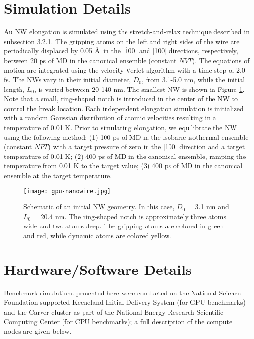 \documentclass[10pt]{report}  %
\newcommand\findent{\hspace*{\parindent}}
\begin{document}
\section{Simulation Details}

\findent Au NW elongation is simulated using the stretch-and-relax technique described in subsection 3.2.1. The gripping atoms on the left and right sides of the wire are periodically displaced by 0.05 \AA\ in the [$\bar{1}$00] and [100] directions, respectively, between 20 ps of MD in the canonical ensemble (constant $NVT$). The equations of motion are integrated using the velocity Verlet algorithm with a time step of 2.0 fs. The NWs vary in their initial diameter, $D_{0}$, from 3.1-5.0 nm, while the initial length, $L_{0}$, is varied between 20-140 nm. The smallest NW is shown in Figure \ref{fig:gpu-nanowire}. Note that a small, ring-shaped notch is introduced in the center of the NW to control the break location. Each independent elongation simulation is initialized with a random Gaussian distribution of atomic velocities resulting in a temperature of 0.01 K. Prior to simulating elongation, we equilibrate the NW using the following method: (1) 100 ps of MD in the isobaric-isothermal ensemble (constant $NPT$) with a target pressure of zero in the [100] direction and a target temperature of 0.01 K; (2) 400 ps of MD in the canonical ensemble, ramping the temperature from 0.01 K to the target value; (3) 400 ps of MD in the canonical ensemble at the target temperature.

\begin{figure}[t!]
	\centering
	\texttt{[image: gpu-nanowire.jpg]}
	\caption{Schematic of an initial NW geometry. In this case, $D_{0}$ = 3.1 nm and $L_{0}$ = 20.4 nm. The ring-shaped notch is approximately three atoms wide and two atoms deep. The gripping atoms are colored in green and red, while dynamic atoms are colored yellow.  }
	\label{fig:gpu-nanowire}
\end{figure}


\section{Hardware/Software Details}

\findent Benchmark simulations presented here were conducted on the National Science Foundation supported Keeneland Initial Delivery System (for GPU benchmarks) and the Carver cluster as part of the National Energy Research Scientific Computing Center (for CPU benchmarks); a full description of the compute nodes are given below.
\end{document}

